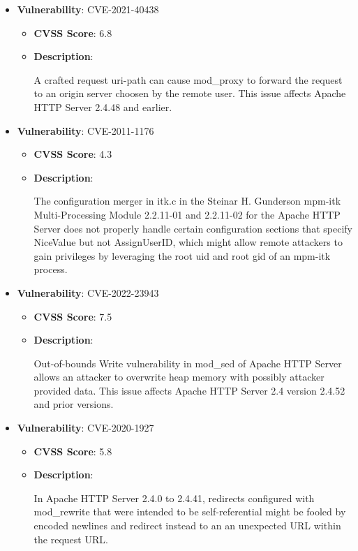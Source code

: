 \documentclass{article}
\begin{document}
\begin{itemize}
        \item \textbf{Vulnerability}: CVE-2021-40438
        \begin{itemize}
            \item \textbf{CVSS Score}:  6.8 
            \item \textbf{Description}:
            \parbox[t]{0.9\linewidth}{
                \ttfamily A crafted request uri-path can cause mod\_proxy to forward the request to an origin server choosen by the remote user. This issue affects Apache HTTP Server 2.4.48 and earlier.
            }
        \end{itemize}
    
        \item \textbf{Vulnerability}: CVE-2011-1176
        \begin{itemize}
            \item \textbf{CVSS Score}:  4.3 
            \item \textbf{Description}:
            \parbox[t]{0.9\linewidth}{
                \ttfamily The configuration merger in itk.c in the Steinar H. Gunderson mpm-itk Multi-Processing Module 2.2.11-01 and 2.2.11-02 for the Apache HTTP Server does not properly handle certain configuration sections that specify NiceValue but not AssignUserID, which might allow remote attackers to gain privileges by leveraging the root uid and root gid of an mpm-itk process.
            }
        \end{itemize}
    
        \item \textbf{Vulnerability}: CVE-2022-23943
        \begin{itemize}
            \item \textbf{CVSS Score}:  7.5 
            \item \textbf{Description}:
            \parbox[t]{0.9\linewidth}{
                \ttfamily Out-of-bounds Write vulnerability in mod\_sed of Apache HTTP Server allows an attacker to overwrite heap memory with possibly attacker provided data. This issue affects Apache HTTP Server 2.4 version 2.4.52 and prior versions.
            }
        \end{itemize}
    
        \item \textbf{Vulnerability}: CVE-2020-1927
        \begin{itemize}
            \item \textbf{CVSS Score}:  5.8 
            \item \textbf{Description}:
            \parbox[t]{0.9\linewidth}{
                \ttfamily In Apache HTTP Server 2.4.0 to 2.4.41, redirects configured with mod\_rewrite that were intended to be self-referential might be fooled by encoded newlines and redirect instead to an an unexpected URL within the request URL.
            }
        \end{itemize}
    

\end{itemize}
\end{document}
